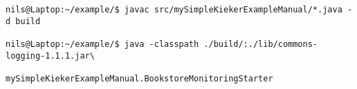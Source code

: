 \begin{lstlisting}
nils@Laptop:~/example/$ javac src/mySimpleKiekerExampleManual/*.java -d build

nils@Laptop:~/example/$ java -classpath ./build/:./lib/commons-logging-1.1.1.jar\
                        mySimpleKiekerExampleManual.BookstoreMonitoringStarter 
\end{lstlisting}
